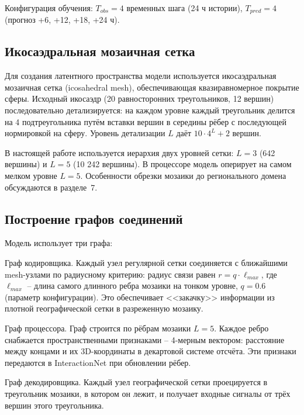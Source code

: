 \documentclass[14pt,a4paper]{extarticle}
\numberwithin{table}{section}
\numberwithin{figure}{section}
\numberwithin{equation}{section}
\begin{document}
Конфигурация обучения: \(T_{obs} = 4\) временных шага (24 ч истории),
\(T_{pred} = 4\) (прогноз +6, +12, +18, +24 ч).

\subsection{Икосаэдральная мозаичная сетка}\label{ux438ux43aux43eux441ux430ux44dux434ux440ux430ux43bux44cux43dux430ux44f-ux43cux43eux437ux430ux438ux447ux43dux430ux44f-ux441ux435ux442ux43aux430}

Для создания латентного пространства модели используется икосаэдральная
мозаичная сетка (icosahedral mesh), обеспечивающая квазиравномерное
покрытие сферы. Исходный икосаэдр (20 равносторонних треугольников, 12
вершин) последовательно детализируется: на каждом уровне каждый
треугольник делится на 4 подтреугольника путём вставки вершин в середины
рёбер с последующей нормировкой на сферу. Уровень детализации \(L\)
даёт \(10 \cdot 4^L + 2\) вершин.

В настоящей работе используется иерархия двух уровней сетки: \(L = 3\)
(642 вершины) и \(L = 5\) (10 242 вершины). В процессоре модель
оперирует на самом мелком уровне \(L = 5\). Особенности обрезки
мозаики до регионального домена обсуждаются в разделе~7.

\subsection{Построение графов соединений}\label{ux43fux43eux441ux442ux440ux43eux435ux43dux438ux435-ux433ux440ux430ux444ux43eux432-ux441ux43eux435ux434ux438ux43dux435ux43dux438ux439}

Модель использует три графа:

Граф кодировщика. Каждый узел регулярной сетки
соединяется с ближайшими mesh-узлами по радиусному критерию: радиус
связи равен \(r = q \cdot \ell_{max}\), где \(\ell_{max}\) -- длина
самого длинного ребра мозаики на тонком уровне, \(q = 0.6\) (параметр
конфигурации). Это обеспечивает <<закачку>> информации из плотной
географической сетки в разреженную мозаику.

Граф процессора. Граф строится по рёбрам мозаики
\(L = 5\). Каждое ребро снабжается пространственными признаками
-- 4-мерным вектором: расстояние между концами и их 3D-координаты в
декартовой системе отсчёта. Эти признаки передаются в InteractionNet при
обновлении рёбер.

Граф декодировщика. Каждый узел географической
сетки проецируется в треугольник мозаики, в котором он лежит, и получает
входные сигналы от трёх вершин этого треугольника.
\end{document}
